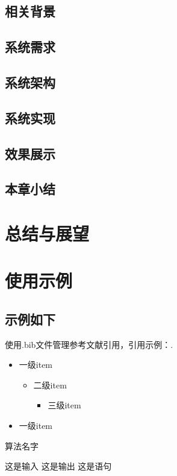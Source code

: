 \documentclass[winfonts,master,twoside,AutoFakeBold= {2}]{njuthesis}
\begin{document}
\section{相关背景}
\section{系统需求}
\section{系统架构}
\section{系统实现}
\section{效果展示}
\section{本章小结}

\chapter{总结与展望}

\chapter{使用示例}
\section{示例如下}
使用.bib文件管理参考文献引用，引用示例：\cite{BHR12}.\par
\begin{itemize}
\item 一级item
 \begin{itemize}
 \item 二级item
	\begin{itemize}
	\item 三级item

	\end{itemize}

 \end{itemize}
\item 一级item

\end{itemize}

\begin{algorithm}[htbp]
  \caption{算法名字}
  \label{alg:alg1}
  \begin{algorithmic}[1]
        \REQUIRE 这是输入
        \ENSURE 这是输出
		      \STATE 这是语句
        \ENDWHILE
  \end{algorithmic}
\end{algorithm}
\end{document}
